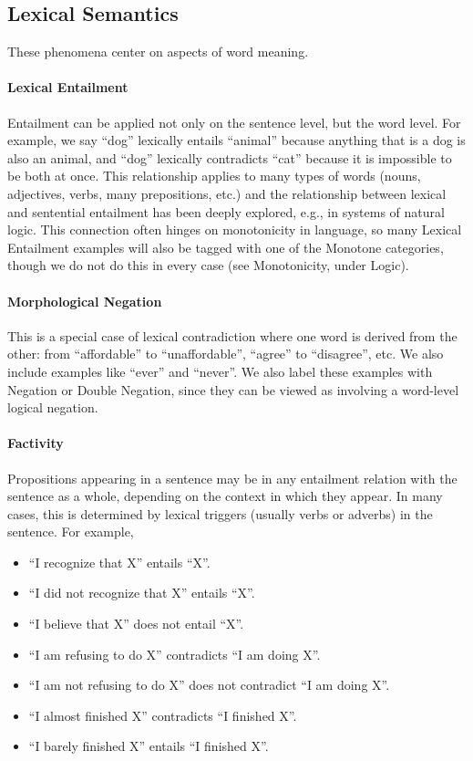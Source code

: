 \documentclass{article} \usepackage{iclr2019_conference,times}
\begin{document}
\subsection{Lexical Semantics}
These phenomena center on aspects of word meaning.

\paragraph{Lexical Entailment} Entailment can be applied not only on the sentence level, but the word level. For example, we say ``dog'' lexically entails ``animal'' because anything that is a dog is also an animal, and ``dog'' lexically contradicts ``cat'' because it is impossible to be both at once. This relationship applies to many types of words (nouns, adjectives, verbs, many prepositions, etc.) and the relationship between lexical and sentential entailment has been deeply explored, e.g., in systems of natural logic. This connection often hinges on monotonicity in language, so many Lexical Entailment examples will also be tagged with one of the Monotone categories, though we do not do this in every case (see Monotonicity, under Logic).

\paragraph{Morphological Negation} This is a special case of lexical contradiction where one word is derived from the other: from ``affordable'' to ``unaffordable'', ``agree'' to ``disagree'', etc. We also include examples like ``ever'' and ``never''. We also label these examples with Negation or Double Negation, since they can be viewed as involving a word-level logical negation.

\paragraph{Factivity} Propositions appearing in a sentence may be in any entailment relation with the sentence as a whole, depending on the context in which they appear. In many cases, this is determined by lexical triggers (usually verbs or adverbs) in the sentence. For example,

\begin{itemize}
    \item ``I recognize that X'' entails ``X''.
    \item ``I did not recognize that X'' entails ``X''.
    \item ``I believe that X'' does not entail ``X''.
    \item ``I am refusing to do X'' contradicts ``I am doing X''.
    \item ``I am not refusing to do X'' does not contradict ``I am doing X''.
    \item ``I almost finished X'' contradicts ``I finished X''.
    \item ``I barely finished X'' entails ``I finished X''.
\end{itemize}
\end{document}
